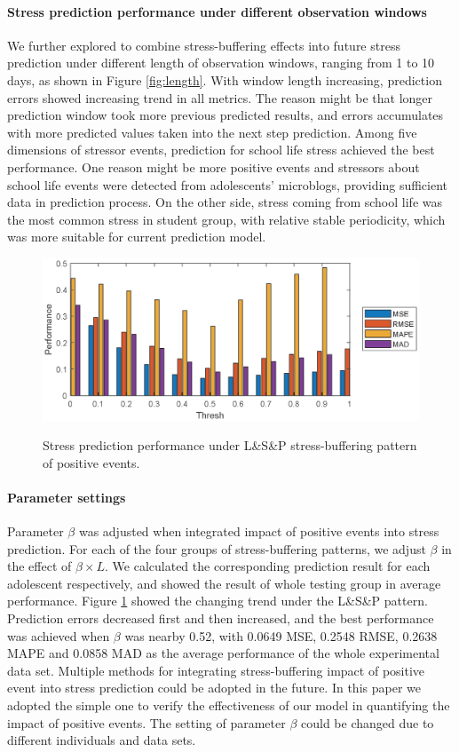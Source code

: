 \paragraph{Stress prediction performance under different observation windows}
We further explored to combine stress-buffering effects into future stress prediction under different length of observation windows, ranging from 1 to 10 days, as shown in Figure \ref{fig:length}.
With window length increasing,
prediction errors showed increasing trend in all metrics.
The reason might be that longer prediction window took more previous predicted results,
and errors accumulates with more predicted values taken into the next step prediction.
Among five dimensions of stressor events,
prediction for school life stress achieved the best performance.
One reason might be more positive events and stressors about school life events were detected from adolescents' microblogs,
providing sufficient data in prediction process.
On the other side,
stress coming from school life was the most common stress in student group,
with relative stable periodicity,
which was more suitable for current prediction model.


\begin{figure}
\centering
\caption{Stress prediction performance under L\&S\&P stress-buffering pattern of positive events.}
\includegraphics[width=\linewidth]{figs/thresh.eps}
\label{fig:thresh}
\end{figure}

\paragraph{Parameter settings}
Parameter $\beta$ was adjusted when integrated impact of positive events into stress prediction.
For each of the four groups of stress-buffering patterns,
we adjust $\beta$ in the effect of $\beta \times L$.
We calculated the corresponding prediction result for each adolescent respectively,
and showed the result of whole testing group in average performance.
Figure \ref{fig:thresh} showed the changing trend under the L\&S\&P pattern.
Prediction errors decreased first and then increased,
and the best performance was achieved when $\beta$ was nearby 0.52,
with 0.0649 MSE, 0.2548 RMSE, 0.2638 MAPE and 0.0858 MAD as the average performance of the whole experimental data set.
Multiple methods for integrating stress-buffering impact of positive event into stress prediction could be adopted in the future.
In this paper we adopted the simple one to verify the effectiveness of our model in quantifying the impact of positive events.
The setting of parameter $\beta$ could be changed due to different individuals and data sets.
